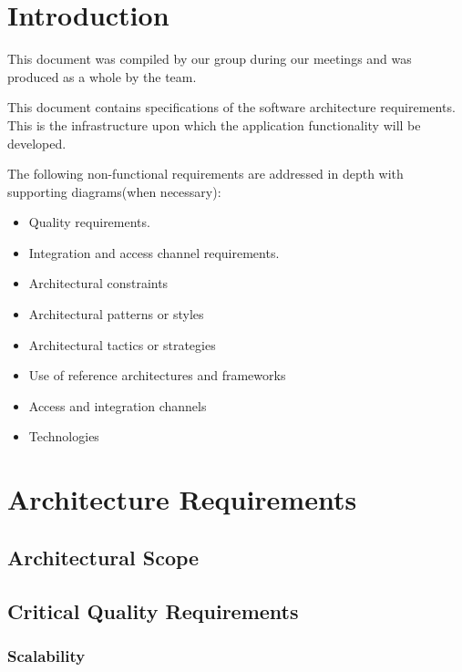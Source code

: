 \documentclass[a4paper,12pt,titlepage]{article}
\begin{document}



\newpage
\tableofcontents


\section{Introduction}

This document was compiled by our group during our meetings and was produced as a whole by the team. \bigskip

This document contains specifications of the software architecture requirements. This is the infrastructure upon which the application functionality will be developed. \bigskip

The following non-functional requirements are addressed in depth with supporting diagrams(when necessary):

\begin{itemize}
	\item Quality requirements.
	\item Integration and access channel requirements.
	\item Architectural constraints
	\item Architectural patterns or styles
	\item Architectural tactics or strategies
	\item Use of reference architectures and frameworks
	\item Access and integration channels
	\item Technologies
\end{itemize}

\newpage

\section{Architecture Requirements}
\subsection{Architectural Scope}
\newpage
\subsection{Critical Quality Requirements}
\subsubsection{Scalability}%
	
\newpage
\end{document}
